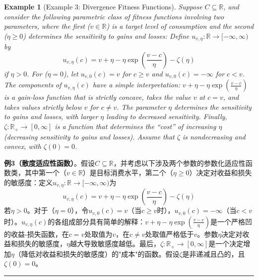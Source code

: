 \documentclass[12pt,a4paper]{article}
\newenvironment{translation}
  {\par\noindent\color{blue!70!black}\smallskip}
  {\par\medskip\hrule\medskip}
\newtheorem{example}[theorem]{Example}
\begin{document}
\begin{example}[Example 3: Divergence Fitness Functions]
Suppose $C \subseteq \mathbb{R}$, and consider the following parametric class of fitness functions involving two parameters, where the first ($v \in \mathbb{R}$) is a target level of consumption and the second ($\eta \geq 0$) determines the sensitivity to gains and losses: Define $u_{v,\eta}: \mathbb{R} \to [-\infty, \infty)$ by
\[
u_{v,\eta}(c) = v + \eta - \eta \exp\left( \frac{v - c}{\eta} \right) - \zeta(\eta)
\]
if $\eta > 0$. For ($\eta = 0$), let $u_{v,0}(c) = v$ for $c \geq v$ and $u_{v,0}(c) = -\infty$ for $c < v$. The components of $u_{v,\eta}(c)$ have a simple interpretation: $v + \eta - \eta \exp(\frac{v-c}{\eta})$ is a gain-loss function that is strictly concave, takes the value $v$ at $c = v$, and takes values strictly below $v$ for $c \neq v$. The parameter $\eta$ determines the sensitivity to gains and losses, with larger $\eta$ leading to decreased sensitivity. Finally, $\zeta: \mathbb{R}_+ \to [0, \infty]$ is a function that determines the ``cost'' of increasing $\eta$ (decreasing sensitivity to gains and losses). Assume that $\zeta$ is nondecreasing and convex, with $\zeta(0) = 0$.
\end{example}
\begin{translation}
\textbf{例3（散度适应性函数）}。假设$C \subseteq \mathbb{R}$，并考虑以下涉及两个参数的参数化适应性函数类，其中第一个（$v \in \mathbb{R}$）是目标消费水平，第二个（$\eta \geq 0$）决定对收益和损失的敏感度：定义$u_{v,\eta}: \mathbb{R} \to [-\infty, \infty)$为
\[
u_{v,\eta}(c) = v + \eta - \eta \exp\left( \frac{v - c}{\eta} \right) - \zeta(\eta)
\]
若$\eta > 0$。对于（$\eta = 0$），令$u_{v,0}(c) = v$（当$c \geq v$时），$u_{v,0}(c) = -\infty$（当$c < v$时）。$u_{v,\eta}(c)$的各组成部分具有简单的解释：$v + \eta - \eta \exp(\frac{v-c}{\eta})$是一个严格凹的收益-损失函数，在$c = v$处取值为$v$，在$c \neq v$处取值严格低于$v$。参数$\eta$决定对收益和损失的敏感度，$\eta$越大导致敏感度越低。最后，$\zeta: \mathbb{R}_+ \to [0, \infty]$是一个决定增加$\eta$（降低对收益和损失的敏感度）的"成本"的函数。假设$\zeta$是非递减且凸的，且$\zeta(0) = 0$。
\end{translation}
\end{document}
